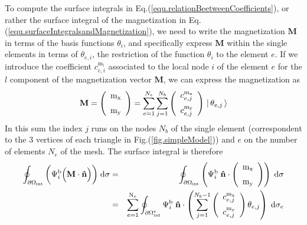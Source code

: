 \documentclass[11pt]{article}
\renewcommand{\d}{\mathrm{d}} %
\newcommand{\rv}[1]{\ensuremath{\mathbf{#1}}} %
\newcommand{\vc}[1]{\,|\,#1 \, \rangle}
\begin{document}
To compute the surface integrals in
Eq.(\ref{equ.relationBeetweenCoefficients}), 
or rather the surface integral of the magnetization in
Eq.(\ref{equ.surfaceIntegralsandMagnetization}), 
we need to write the magnetization $\rv{M}$ in terms of the
basis functions $\theta_i$, and specifically express $\rv{M}$
within the single elements in terms of $\theta_{e,i}$, the
restriction of the function $\theta_i$ to the element $e$. 
If we introduce the coefficient $c^\mathrm{m_l}_{e,i}$   
associated to the local node $i$ of the element $e$ for the $l$
component of the magnetization vector $\rv{M}$, we can express the
magnetization as  
\begin{equation}
  \rv{M} = 
  \left(
    \begin {array}{c}
      \mathrm{m_x}\\
      \noalign{\medskip}
      \mathrm{m_y}\\
    \end {array}
  \right) 
  =
  \sum_{e=1}^{N_e} \sum_{j=1}^{N_b} \left(
      \begin {array}{c}
        c^\mathrm{m_x}_{e,j}\\
        \noalign{\medskip}
        c^\mathrm{m_y}_{e,j}\\
      \end {array}
    \right)
  \vc{\theta_{e,j}}  
  \label{equ.magnetizationDiscretisation}
\end{equation}
In this sum the index $j$ runs on the 
nodes $N_b$ of the single element (correspondent to the 3 vertices of each
triangle in Fig.(\ref{fig.simpleModel})) and $e$ on the number of
elements $N_e$ of the mesh.
The surface integral is therefore
\begin{eqnarray}
  \oint_{\partial \Omega_\mathrm{int}} \bigg( \Psi^\mathrm{b}_{i}
  \Big( \rv{M}\cdot \rv{\hat{n}}\Big) \bigg) 
  \;  \d\sigma
  & = &
  \oint_{\partial \Omega_\mathrm{int}} 
  \left(
    \Psi^\mathrm{b}_{i} \;
    \rv{\hat{n}} 
    \cdot 
    \left(
      \begin {array}{c}
        \mathrm{m_x}\\
        \noalign{\medskip}
        \mathrm{m_y}\\
      \end {array}
    \right)
  \right) 
  \;  \d\sigma
  \nonumber \\ & = &
  \sum_{e=1}^{\mathrm{N}_e}
  \oint_{\partial \Omega^{e}_\mathrm{int}} 
  \Psi^\mathrm{b}_{i} \;
  \rv{\hat{n}} 
  \cdot 
  \left(
    \sum_{j=1}^{N_b-1} 
    \left(
      \begin {array}{c}
        c^\mathrm{m_x}_{e,j}\\
        \noalign{\medskip}
        c^\mathrm{m_y}_{e,j}\\
      \end {array}
    \right)
    \theta_{e,j}
  \right) 
  \;  \d\sigma_e
  \label{equ.normalProduct_a}
\end{eqnarray}
\end{document}
